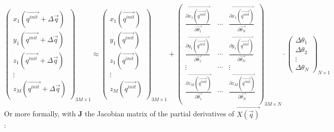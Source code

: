 \begin{equation}
    \begin{pmatrix}x_1(\overrightarrow{q^{init ^{\ }}}+\Delta\overrightarrow{q})\\ y_1(\overrightarrow{q^{init ^{\ }}}+\Delta\overrightarrow{q})\\ z_1(\overrightarrow{q^{init ^{\ }}}+\Delta\overrightarrow{q})\\ \vdots \\ z_M(\overrightarrow{q^{init ^{\ }}}+\Delta\overrightarrow{q})\end{pmatrix}_{3M \times 1}
    \approx \begin{pmatrix}x_1(\overrightarrow{q^{init}})\\ y_1(\overrightarrow{q^{init}})\\ z_1(\overrightarrow{q^{init}})\\ \vdots \\ z_M(\overrightarrow{q^{init}})\end{pmatrix}_{3M \times 1}
    + \begin{pmatrix}
        \frac{\partial{\overrightarrow{x_1(\overrightarrow{q^{init}})}}}{\partial{\overrightarrow{\theta_1}}} 
        & \cdots 
        & \frac{\partial{\overrightarrow{x_1(\overrightarrow{q^{init}})}}}{\partial{\overrightarrow{\theta_N}}} \\
        \frac{\partial{\overrightarrow{y_1(\overrightarrow{q^{init}})}}}{\partial{\overrightarrow{\theta_1}}} 
        & \cdots 
        & \frac{\partial{\overrightarrow{y_1(\overrightarrow{q^{init}})}}}{\partial{\overrightarrow{\theta_N}}} \\
        \vdots & \cdots & \vdots \\
        \frac{\partial{\overrightarrow{z_M(\overrightarrow{q^{init}})}}}{\partial{\overrightarrow{\theta_1}}} 
        & \cdots 
        & \frac{\partial{\overrightarrow{z_M(\overrightarrow{q^{init}})}}}{\partial{\overrightarrow{\theta_N}}} \\
    \end{pmatrix}_{3M\times N}
    \! \! \! \! \! \! \cdot \begin{pmatrix}\Delta\theta_1\\ \Delta\theta_2\\ \vdots \\ \Delta\theta_N\end{pmatrix}_{N \times 1}
\end{equation}
Or more formally, with \textbf{J} the Jacobian matrix of the partial derivatives of $\overrightarrow{X(\overrightarrow{q})}$ :
